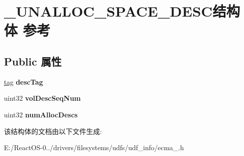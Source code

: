 \hypertarget{struct___u_n_a_l_l_o_c___s_p_a_c_e___d_e_s_c}{}\section{\+\_\+\+U\+N\+A\+L\+L\+O\+C\+\_\+\+S\+P\+A\+C\+E\+\_\+\+D\+E\+S\+C结构体 参考}
\label{struct___u_n_a_l_l_o_c___s_p_a_c_e___d_e_s_c}
\subsection*{Public 属性}
\begin{DoxyCompactItemize}
\item 
\mbox{\label{struct___u_n_a_l_l_o_c___s_p_a_c_e___d_e_s_c_aa94ea75bb431267795994a3988aadb87}} 
\hyperlink{structtag}{tag} {\bfseries desc\+Tag}
\item 
\mbox{\label{struct___u_n_a_l_l_o_c___s_p_a_c_e___d_e_s_c_a41f9e95bc97f5d6efe4b042a9a59c08b}} 
uint32 {\bfseries vol\+Desc\+Seq\+Num}
\item 
\mbox{\label{struct___u_n_a_l_l_o_c___s_p_a_c_e___d_e_s_c_afbac1c32029fd826830d030dcb05691e}} 
uint32 {\bfseries num\+Alloc\+Descs}
\end{DoxyCompactItemize}


该结构体的文档由以下文件生成\+:\begin{DoxyCompactItemize}
\item 
E\+:/\+React\+O\+S-\/0../drivers/filesystems/udfs/udf\+\_\+info/ecma\+\_.\+h\end{DoxyCompactItemize}
